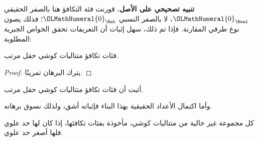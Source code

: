 \documentclass[../../../include/open-logic-section]{subfiles}
\begin{document}
\textbf{تنبيه تصحيحي على الأصل.} قورنت فئة التكافؤ هنا بالصفر الحقيقي
${\OLMathNumeral{0}}_\Real$، لا بالصفر النسبي ${\OLMathNumeral{0}}_\Rat$؛ فذلك يصون نوع طرفي المقارنة.
فإذا تم ذلك، سهل إثبات أن التعريفات تحقق الخواص الجبرية المطلوبة:
\begin{thm}
فئات تكافؤ متتاليات كوشي حقل مرتب.
\end{thm}

\begin{proof}
يترك البرهان تمرينًا.
\end{proof}

\begin{prob}
أثبت أن فئات تكافؤ متتاليات كوشي حقل مرتب.
\end{prob}

وأما اكتمال الأعداد الحقيقية بهذا البناء فإثباته أشق، ولذلك نسوق برهانه.

\begin{thm}
كل مجموعة غير خالية من متتاليات كوشي، مأخوذة بفئات تكافئها، إذا كان لها حد علوي فلها أصغر حد علوي.
\end{thm}
\end{document}
